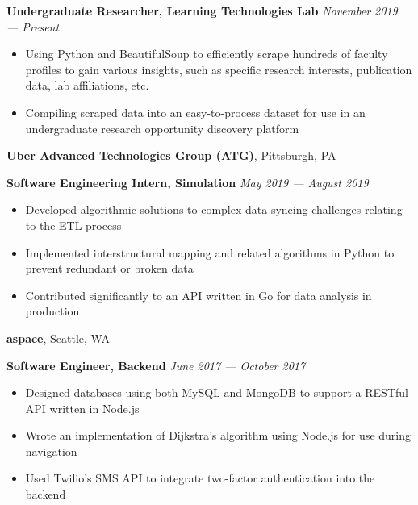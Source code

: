 \documentclass[11pt]{article}
\begin{document}
\begin{flushleft}
		\begin{leftline}
			{\small \textbf{Undergraduate Researcher, Learning Technologies Lab}} \hfill \textit{\small November 2019 --- Present}
			\begin{itemize}
				\item Using Python and BeautifulSoup to efficiently scrape hundreds of faculty profiles to gain various insights, such as specific research interests, publication data, lab affiliations, etc.
				\vspace{-2mm}
				\item Compiling scraped data into an easy-to-process dataset for use in an undergraduate research opportunity discovery platform
			\end{itemize}
		\end{leftline}


		\vspace{-1.35mm}
		\textbf{Uber Advanced Technologies Group (ATG)}, Pittsburgh, PA\\
		\begin{leftline}
			{\small \textbf{Software Engineering Intern, Simulation}} \hfill \textit{\small May 2019 --- August 2019}
			\begin{itemize}
				\item Developed algorithmic solutions to complex data-syncing challenges relating to the ETL process
				\vspace{-2mm}
				\item Implemented interstructural mapping and related algorithms in Python to prevent redundant or broken data
				\vspace{-2mm}
				\item Contributed significantly to an API written in Go for data analysis in production
			\end{itemize}
		\end{leftline}

	
		\vspace{-1.35mm}
		\textbf{aspace}, Seattle, WA\\
		\begin{leftline}
			{\small \textbf{Software Engineer, Backend} \hfill \textit{June 2017 --- October 2017}}

			\begin{itemize}
				\item Designed databases using both MySQL and MongoDB to support a RESTful API written in Node.js
				\vspace{-2mm}
				\item Wrote an implementation of Dijkstra's algorithm using Node.js for use during navigation
				\vspace{-2mm}
				\item Used Twilio's SMS API to integrate two-factor authentication into the backend
			\end{itemize}
		\end{leftline}


\end{flushleft}
\end{document}
